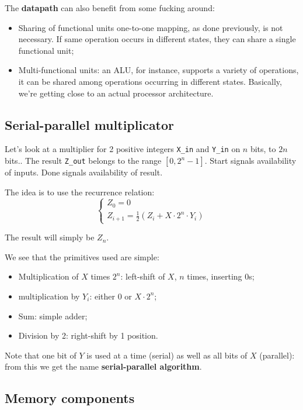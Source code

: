 \documentclass[a4paper,11pt]{article}
\begin{document}
The \textbf{datapath} can also benefit from some fucking around:
\begin{itemize}
	\item Sharing of functional units one-to-one mapping, as done previously, is not necessary. If same operation occurs in different states, they can share a single functional unit;
	\item Multi-functional units: an ALU, for instance, supports a variety of operations, it can be shared among operations occurring in different states. Basically, we're getting close to an actual processor architecture.
\end{itemize}

\subsection{Serial-parallel multiplicator}

Let's look at a multiplier for 2 positive integers \texttt{X\_in} and \texttt{Y\_in} on $n$ bits, to $2n$ bits..
The result \texttt{Z\_out} belongs to the range $[0, 2^n - 1]$. Start signals availability of inputs. Done signals availability of result.

The idea is to use the recurrence relation:
$$
	\begin{cases}
		Z_0 = 0 \\
		Z_{i + 1} = \frac{1}{2}\left( Z_i + X \cdot 2^n \cdot Y_i \right)
	\end{cases}
$$

The result will simply be $Z_n$.

We see that the primitives used are simple:
\begin{itemize}
	\item Multiplication of $X$ times $2^n$: left-shift of $X$, $n$ times, inserting 0s;
	\item multiplication by $Y_i$: either $0$ or $X \cdot 2^n$;
	\item Sum: simple adder;
	\item Division by 2: right-shift by 1 position.
\end{itemize}

Note that one bit of $Y$ is used at a time (serial) as well as all bits
of $X$ (parallel): from this we get the name \textbf{serial-parallel algorithm}.

\subsection{Memory components}
\end{document}
